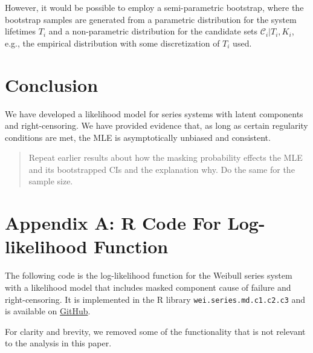 \documentclass[
]{article}
\begin{document}
However, it would be possible to employ a semi-parametric bootstrap,
where the bootstrap samples are generated from a parametric distribution
for the system lifetimes \(T_i\) and a non-parametric distribution for
the candidate sets \(\mathcal{C}_i | T_i, K_i\), e.g., the empirical
distribution with some discretization of \(T_i\) used.

\hypertarget{conclusion}{%
\section{Conclusion}\label{conclusion}}

We have developed a likelihood model for series systems with latent
components and right-censoring. We have provided evidence that, as long
as certain regularity conditions are met, the MLE is asymptotically
unbiased and consistent.

\begin{quote}
Repeat earlier results about how the masking probability effects the MLE
and its bootstrapped CIs and the explanation why. Do the same for the
sample size.
\end{quote}

\hypertarget{appendix-a-r-code-for-log-likelihood-function}{%
\section*{Appendix A: R Code For Log-likelihood
Function}\label{appendix-a-r-code-for-log-likelihood-function}}

\label{app:loglike-code}

The following code is the log-likelihood function for the Weibull series
system with a likelihood model that includes masked component cause of
failure and right-censoring. It is implemented in the R library
\texttt{wei.series.md.c1.c2.c3} and is available on
\href{https://github.com/queelius/wei.series.md.c1.c2.c3}{GitHub}.

For clarity and brevity, we removed some of the functionality that is
not relevant to the analysis in this paper.
\end{document}
